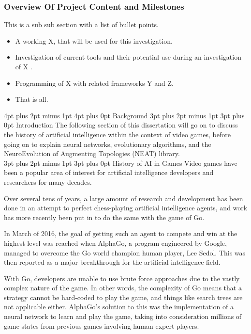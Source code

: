 \documentclass[12pt,a4paper]{article}
\makeatletter
\renewcommand\subsection{\@startsection {subsection}{1}{2mm} %
                               {3pt plus 2pt minus 1pt} %
                               {3pt plus 0pt} %
                               {\normalfont\bfseries}}
\renewcommand\section{\@startsection {section}{1}{0mm} %
                               {4pt plus 2pt minus 1pt} %
                               {4pt plus 0pt} %
                               {\bfseries}}
\makeatother
\begin{document}
 \subsubsection{Overview Of Project Content and Milestones}

This is a sub sub section with a list of bullet points.
\begin{itemize}\itemsep0pt
	\item A working X, that will be used for this investigation.
	\item Investigation of current tools and their potential use during an investigation of X .
	\item Programming of X with related frameworks Y and Z.
	\item That is all.
\end{itemize}

\newpage
\section{Background}
\subsection{Introduction}
The following section of this dissertation will go on to discuss the history of artificial intelligence within the context of video games, before going on to explain neural networks, evolutionary algorithms, and the NeuroEvolution of Augmenting Topologies (NEAT) library.
\\
\subsection{History of AI in Games}
Video games have been a popular area of interest for artificial intelligence developers and researchers for many decades. 

Over several tens of years, a large amount of research and development has been done in an attempt to perfect chess-playing artificial intelligence agents\citep{L2PChess}, and work has more recently been put in to do the same with the game of Go.  

In March of 2016, the goal of getting such an agent to compete and win at the highest level was reached when AlphaGo, a program engineered by Google, managed to overcome the Go world champion human player, Lee Sedol\citep{ABriefHistoryOfGameAI}. This was then reported as a major breakthrough for the artificial intelligence field. 

With Go, developers are unable to use brute force approaches due to the vastly complex nature of the game\citep{13}. In other words, the complexity of Go means that a strategy cannot be hard-coded to play the game, and things like search trees are not applicable either. AlphaGo's solution to this was the implementation of a neural network to learn and play the game, taking into consideration millions of game states from previous games involving human expert players. 
\end{document}
